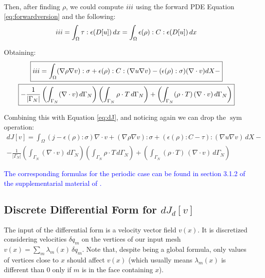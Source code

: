 \documentclass[11pt]{article}
\DeclareMathOperator{\sym}{sym}
\newcommand{\RNum}[1]{\uppercase\expandafter{\romannumeral #1\relax}}
\newcommand{\blue}{\textcolor{blue}}
\begin{document}
Then, after finding $\rho$, we could compute $\RNum{3}$ using the forward PDE Equation \ref{eq:forwardversion} and the following:
\begin{align*}
  \RNum{3} = \int_\Omega \tau:\epsilon(D[u])\, dx = \int_\Omega \epsilon(\rho):C:\epsilon(D[u]) \, dx
\end{align*}

Obtaining:
\begin{multline}
  \boxed{\RNum{3} =
  \int_{\Omega} (\nabla \rho \nabla v):\sigma + \epsilon(\rho):C:(\nabla u \nabla v) - (\epsilon(\rho): \sigma) (\nabla \cdot v)  dX -} \\ \boxed{- \frac{1}{|\Gamma_N|} \left( \int_{\Gamma_{N}} (\nabla \cdot v) \, d\Gamma_{N} \right)  \left(\int_{\Gamma_N} \rho \cdot T\, d\Gamma_N\right) + \left(\int_{\Gamma_{N}} (\rho \cdot T) \, (\nabla \cdot v)\, d\Gamma_{N}\right)}
  \label{eq:IIIcomputation}
\end{multline}

Combining this with Equation \ref{eq:dJ}, and noticing again we can drop the $\sym$ operation:
\begin{multline}
  \boxed{dJ[v] = \int_{\Omega} (j - \epsilon(\rho): \sigma)\nabla \cdot v + (\nabla \rho \nabla v):\sigma + (\epsilon(\rho):C - \tau) : (\nabla u \nabla v) \, dX -} \\ \boxed{- \frac{1}{|\Gamma_N|} \left( \int_{\Gamma_{N}} (\nabla \cdot v) \, d\Gamma_{N} \right)  \left(\int_{\Gamma_N} \rho \cdot T\, d\Gamma_N\right) + \left(\int_{\Gamma_{N}} (\rho \cdot T) \, (\nabla \cdot v)\, d\Gamma_{N}\right)}
  \label{eq:completedJ}
\end{multline}

\blue{The corresponding formulas for the periodic case can be found in section 3.1.2 of the supplementarial material of \cite{panetta2017}.}

\subsection{Discrete Differential Form for $dJ_d[v]$}

The input of the differential form is a velocity vector field $v(x)$. It is discretized considering velocities $\delta q_m$ on the vertices of our input mesh $v(x) = \sum_m \lambda_m(x) \, \delta q_m$. Note that, despite being a global formula, only values of vertices close to $x$ should affect $v(x)$ (which usually means $\lambda_m(x)$ is different than $0$ only if $m$ is in the face containing $x$).
\end{document}
